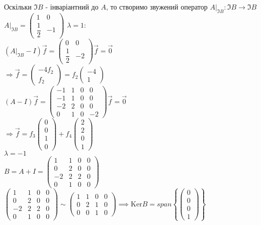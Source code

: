 \documentclass[a4paper, 10pt]{article}
\def\ker#1{\textrm{Ker} {#1}}
\theoremstyle{theoremdd}
\theoremstyle{theoremdd}
\theoremstyle{theoremdd}
\theoremstyle{theoremdd}
\theoremstyle{theoremdd}
\theoremstyle{theoremdd}
\theoremstyle{theoremdd}
\theoremstyle{theoremdd}
\begin{document}
Оскільки $\Im B$ - інваріантний до $A$, то створимо звужений оператор $A|_{\Im B}: \Im B \to \Im B$\\
$A|_{\Im B} = \begin{pmatrix}
1 & 0 \\
\dfrac{1}{2} & -1
\end{pmatrix}$
$\lambda = 1:$\\
$(A|_{\Im B} - I)\vec{f} = \begin{pmatrix}
0 & 0 \\
\dfrac{1}{2} & -2
\end{pmatrix} \vec{f} = \vec{0}$\\
$\Rightarrow \vec{f} = \begin{pmatrix}
-4f_2 \\ f_2
\end{pmatrix} = f_2 \begin{pmatrix}
-4 \\ 1
\end{pmatrix}$\\
$(A-I)\vec{f} = \begin{pmatrix}
-1 & 1 & 0 & 0 \\
-1 & 1 & 0 & 0 \\
-2 & 2 & 0 & 0 \\
0 & 1 & 0 & -2
\end{pmatrix} \vec{f} = \vec{0}$\\
$\Rightarrow \vec{f} = f_3 \begin{pmatrix}
0 \\ 0 \\ 1 \\ 0
\end{pmatrix} + f_4 \begin{pmatrix}
2 \\ 2 \\ 0 \\ 1
\end{pmatrix}$
\bigskip \\
$\lambda = -1$\\
$B = A+I = \begin{pmatrix}
1 & 1 & 0 & 0 \\
0 & 2 & 0 & 0 \\
-2 & 2 & 2 & 0 \\
0 & 1 & 0 & 0
\end{pmatrix}$\\
$\begin{pmatrix}
1 & 1 & 0 & 0 \\
0 & 2 & 0 & 0 \\
-2 & 2 & 2 & 0 \\
0 & 1 & 0 & 0
\end{pmatrix} \sim \begin{pmatrix}
1 & 1 & 0 & 0 \\
0 & 2 & 1 & 0 \\
0 & 0 & 1 & 0
\end{pmatrix} \implies \ker B = span \left\{ \begin{pmatrix}
0 \\ 0 \\ 0 \\ 1
\end{pmatrix} \right\}$
\end{document}
